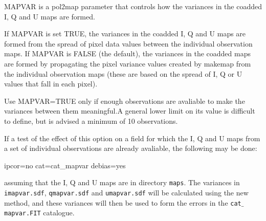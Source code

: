 MAPVAR is a pol2map parameter that controls how the variances in the
coadded I, Q and U maps are formed.

If MAPVAR is set TRUE, the variances in the coadded I, Q and U maps
are formed from the spread of pixel data values between the individual
observation maps. If MAPVAR is FALSE (the default), the variances in
the coadded maps are formed by propagating the pixel variance values
created by makemap from the individual observation maps (these are
based on the spread of I, Q or U values that fall in each pixel).

Use MAPVAR=TRUE only if enough observations are avaliable to make the
variances between them meaningful.A general lower limit on its value
is difficult to define, but is advised a minimum of 10 observations.


If a test of the effect of this option on a field for which the I, Q
and U maps from a set of individual observations are already
avaliable, the following may be done:

\begin{terminalv}
                   ipcor=no cat=cat_mapvar debias=yes
\end{terminalv}

assuming that the I, Q and U maps are in directory \texttt{maps}. The
variances in \texttt{imapvar.sdf}, \texttt{qmapvar.sdf} and
\texttt{umapvar.sdf} will be calculated using the new method, and
these variances will then be used to form the errors in the
\texttt{cat$\_$mapvar.FIT} catalogue.



